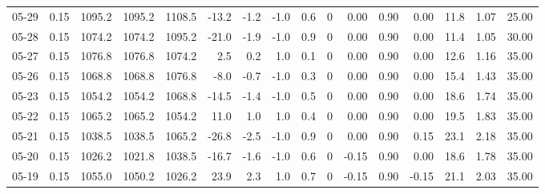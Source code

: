 \begin{threeparttable}
{\begin{tabular}{lrrrrrrrrrrrrrrr}
  05-29 &     0.15 & 1095.2 & 1095.2 & 1108.5 &      -13.2 &           -1.2 &                     -1.0 &                 0.6 &              0 &       0.00 &      0.90 &           0.00 &             11.8 &            1.07 &                  25.00 \\
  05-28 &     0.15 & 1074.2 & 1074.2 & 1095.2 &      -21.0 &           -1.9 &                     -1.0 &                 0.9 &              0 &       0.00 &      0.90 &           0.00 &             11.4 &            1.05 &                  30.00 \\
  05-27 &     0.15 & 1076.8 & 1076.8 & 1074.2 &        2.5 &            0.2 &                      1.0 &                 0.1 &              0 &       0.00 &      0.90 &           0.00 &             12.6 &            1.16 &                  35.00 \\
  05-26 &     0.15 & 1068.8 & 1068.8 & 1076.8 &       -8.0 &           -0.7 &                     -1.0 &                 0.3 &              0 &       0.00 &      0.90 &           0.00 &             15.4 &            1.43 &                  35.00 \\
  05-23 &     0.15 & 1054.2 & 1054.2 & 1068.8 &      -14.5 &           -1.4 &                     -1.0 &                 0.5 &              0 &       0.00 &      0.90 &           0.00 &             18.6 &            1.74 &                  35.00 \\
  05-22 &     0.15 & 1065.2 & 1065.2 & 1054.2 &       11.0 &            1.0 &                      1.0 &                 0.4 &              0 &       0.00 &      0.90 &           0.00 &             19.5 &            1.83 &                  35.00 \\
  05-21 &     0.15 & 1038.5 & 1038.5 & 1065.2 &      -26.8 &           -2.5 &                     -1.0 &                 0.9 &              0 &       0.00 &      0.90 &           0.15 &             23.1 &            2.18 &                  35.00 \\
  05-20 &     0.15 & 1026.2 & 1021.8 & 1038.5 &      -16.7 &           -1.6 &                     -1.0 &                 0.6 &              0 &      -0.15 &      0.90 &           0.00 &             18.6 &            1.78 &                  35.00 \\
  05-19 &     0.15 & 1055.0 & 1050.2 & 1026.2 &       23.9 &            2.3 &                      1.0 &                 0.7 &              0 &      -0.15 &      0.90 &          -0.15 &             21.1 &            2.03 &                  35.00 \\

\end{tabular}}
\end{threeparttable}

